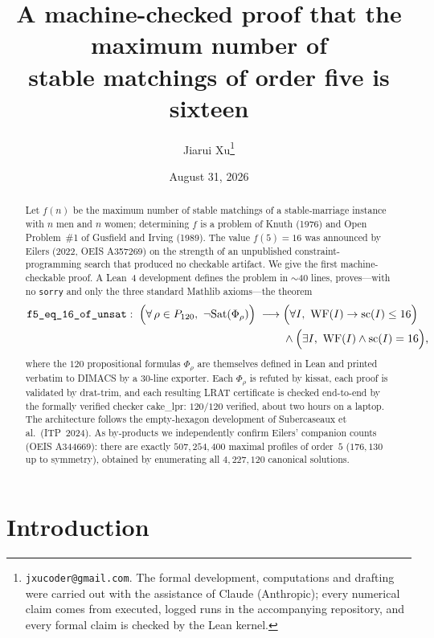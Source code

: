 \documentclass[11pt]{article}
\title{A machine-checked proof that the maximum number of\\
stable matchings of order five is sixteen}
\author{Jiarui Xu\thanks{\texttt{jxucoder@gmail.com}. The formal development, computations and
drafting were carried out with the assistance of Claude (Anthropic); every numerical claim
comes from executed, logged runs in the accompanying repository, and every formal claim is
checked by the Lean kernel.}}
\date{August 31, 2026}
\begin{document}
\maketitle

\begin{abstract}
Let $f(n)$ be the maximum number of stable matchings of a stable-marriage instance with $n$ men
and $n$ women; determining $f$ is a problem of Knuth (1976) and Open Problem~\#1 of Gusfield and
Irving (1989). The value $f(5)=16$ was announced by Eilers (2022, OEIS A357269) on the strength
of an unpublished constraint-programming search that produced no checkable artifact. We give the
first machine-checkable proof. A Lean~4 development defines the problem in $\sim$40 lines,
proves---with no \texttt{sorry} and only the three standard Mathlib axioms---the theorem
\begin{align*}
\texttt{f5\_eq\_16\_of\_unsat} :\;
\Bigl(\forall\, \rho \in P_{120},\ \neg\mathrm{Sat}(\Phi_\rho)\Bigr) \;\longrightarrow\;
&\Bigl(\forall I,\ \mathrm{WF}(I) \to \mathrm{sc}(I) \le 16\Bigr)\\
&{}\wedge \Bigl(\exists I,\ \mathrm{WF}(I) \wedge \mathrm{sc}(I) = 16\Bigr),
\end{align*}
where the $120$ propositional formulas $\Phi_\rho$ are themselves defined in Lean and printed
verbatim to DIMACS by a 30-line exporter. Each $\Phi_\rho$ is refuted by \textsf{kissat}, each
proof is validated by \textsf{drat-trim}, and each resulting LRAT certificate is checked
end-to-end by the formally verified checker \textsf{cake\_lpr}: $120/120$ verified, about two
hours on a laptop. The architecture follows the empty-hexagon development of Subercaseaux et
al.\ (ITP~2024). As by-products we independently confirm Eilers' companion counts (OEIS
A344669): there are exactly $507{,}254{,}400$ maximal profiles of order~$5$
($176{,}130$ up to symmetry), obtained by enumerating all $4{,}227{,}120$ canonical solutions.
\end{abstract}

\section{Introduction}
\end{document}
